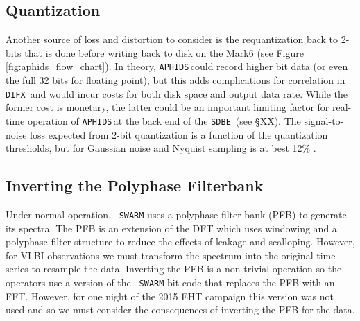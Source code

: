 \documentclass[11pt,preprint]{aastex}
\newcommand{\SWARM}[1]{\texttt{#1\,SWARM}}
\newcommand{\SDBE}{\texttt{SDBE}}
\newcommand{\APHIDS}{\texttt{APHIDS}}
\newcommand{\DIFX}{\texttt{DIFX}}
\begin{document}
\subsection{Quantization}
Another source of loss and distortion to consider is the requantization back to 2-bits that is done
before writing back to disk on the Mark6 (see Figure \ref{fig:aphids_flow_chart}).  In theory, \APHIDS\,could 
record higher bit data (or even the full 32 bits for floating point), but this adds complications for 
correlation 
in \DIFX\ and would incur costs for both disk space and output data rate.  While the former cost is monetary, the 
latter could be an important limiting factor for real-time operation of \APHIDS\,at the back end of the \SDBE\,
(see \S XX).  The signal-to-noise loss expected from 2-bit quantization is a function of the quantization 
thresholds, but for Gaussian noise and Nyquist sampling is at best 12\% \citep{cooper70,thompson01}.

\subsection{Inverting the Polyphase Filterbank}
Under normal operation, \SWARM{} uses a polyphase filter bank (PFB) to generate its spectra.  The PFB is an 
extension of the DFT which uses windowing and a polyphase filter structure to reduce the effects of leakage
and scalloping.  However, for VLBI observations we must transform the spectrum into the original time series to
resample the data.  Inverting the PFB is a non-trivial operation so the operators use a version of the \SWARM{}
bit-code that replaces the PFB with an FFT.  However, for one night of the 2015 EHT campaign this version was not
used and so we must consider the consequences of inverting the PFB for the data.
\end{document}
